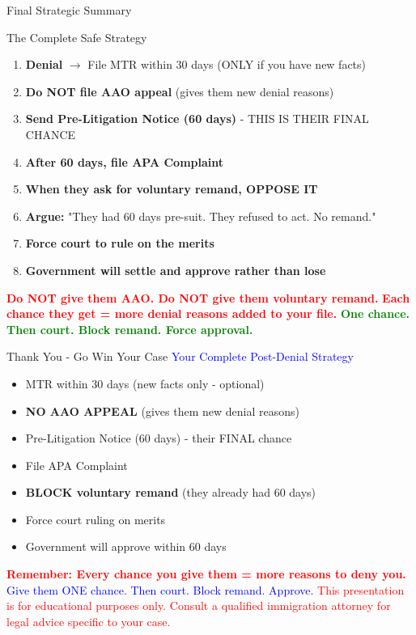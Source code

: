 \documentclass[11pt]{beamer}
\begin{document}
	\begin{frame}{Final Strategic Summary}
		\scriptsize
		\begin{block}{The Complete Safe Strategy}
			\begin{enumerate}
				\item \textbf{Denial} $\rightarrow$ File MTR within 30 days (ONLY if you have new facts)
				\item \textbf{Do NOT file AAO appeal} (gives them new denial reasons)
				\item \textbf{Send Pre-Litigation Notice (60 days)} - THIS IS THEIR FINAL CHANCE
				\item \textbf{After 60 days, file APA Complaint}
				\item \textbf{When they ask for voluntary remand, OPPOSE IT}
				\item \textbf{Argue:} "They had 60 days pre-suit. They refused to act. No remand."
				\item \textbf{Force court to rule on the merits}
				\item \textbf{Government will settle and approve rather than lose}
			\end{enumerate}
			\vspace{0.3cm}
			\textcolor{red}{\textbf{Do NOT give them AAO. Do NOT give them voluntary remand.}}
			\textcolor{red}{\textbf{Each chance they get = more denial reasons added to your file.}}
			\vspace{0.2cm}
			\textcolor{green}{\textbf{One chance. Then court. Block remand. Force approval.}}
		\end{block}
	\end{frame}
	
	\begin{frame}{Thank You - Go Win Your Case}
		\centering
		\vspace{1cm}
		\textcolor{blue}{\Large Your Complete Post-Denial Strategy}
		\vspace{0.5cm}
		\begin{itemize}
			\item MTR within 30 days (new facts only - optional)
			\item \textbf{NO AAO APPEAL} (gives them new denial reasons)
			\item Pre-Litigation Notice (60 days) - their FINAL chance
			\item File APA Complaint
			\item \textbf{BLOCK voluntary remand} (they already had 60 days)
			\item Force court ruling on merits
			\item Government will approve within 60 days
		\end{itemize}
		\vspace{0.5cm}
		\textcolor{red}{\textbf{Remember: Every chance you give them = more reasons to deny you.}}
		\vspace{0.2cm}
		\textcolor{blue}{\Large Give them ONE chance. Then court. Block remand. Approve.}
		\vspace{0.5cm}
		\textcolor{red}{This presentation is for educational purposes only. Consult a qualified immigration attorney for legal advice specific to your case.}
	\end{frame}
	
\end{document}
